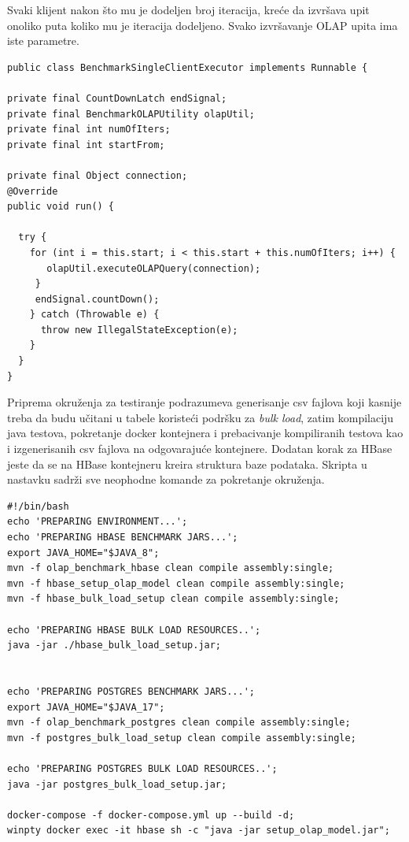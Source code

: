 \documentclass[12pt,oneside]{memoir}
\begin{document}
Svaki klijent nakon što mu je dodeljen broj iteracija, kreće da izvršava upit onoliko puta koliko mu je iteracija dodeljeno. Svako izvršavanje OLAP upita ima iste parametre.


\begin{lstlisting}[title={BenchmarkSingleClientExecutor.java},captionpos=t]
public class BenchmarkSingleClientExecutor implements Runnable {

private final CountDownLatch endSignal;
private final BenchmarkOLAPUtility olapUtil;
private final int numOfIters;
private final int startFrom;

private final Object connection;
@Override
public void run() {

  try {
    for (int i = this.start; i < this.start + this.numOfIters; i++) {
       olapUtil.executeOLAPQuery(connection);
     }
     endSignal.countDown();
    } catch (Throwable e) {
      throw new IllegalStateException(e);
    }
  }
}
\end{lstlisting}

Priprema okruženja za testiranje podrazumeva generisanje csv fajlova koji kasnije treba da budu učitani u tabele koristeći podršku za \textit{bulk load}, zatim kompilaciju java testova, pokretanje docker kontejnera i prebacivanje kompiliranih testova kao i izgenerisanih csv fajlova na odgovarajuće kontejnere. Dodatan korak za HBase jeste da se na HBase kontejneru kreira struktura baze podataka. Skripta u nastavku sadrži sve neophodne komande za pokretanje okruženja.

\begin{lstlisting}[title={prepareEnv.sh},captionpos=t]
#!/bin/bash
echo 'PREPARING ENVIRONMENT...';
echo 'PREPARING HBASE BENCHMARK JARS...';
export JAVA_HOME="$JAVA_8";
mvn -f olap_benchmark_hbase clean compile assembly:single;
mvn -f hbase_setup_olap_model clean compile assembly:single;
mvn -f hbase_bulk_load_setup clean compile assembly:single;

echo 'PREPARING HBASE BULK LOAD RESOURCES..';
java -jar ./hbase_bulk_load_setup.jar;


echo 'PREPARING POSTGRES BENCHMARK JARS...';
export JAVA_HOME="$JAVA_17";
mvn -f olap_benchmark_postgres clean compile assembly:single;
mvn -f postgres_bulk_load_setup clean compile assembly:single;

echo 'PREPARING POSTGRES BULK LOAD RESOURCES..';
java -jar postgres_bulk_load_setup.jar;

docker-compose -f docker-compose.yml up --build -d;
winpty docker exec -it hbase sh -c "java -jar setup_olap_model.jar";
\end{lstlisting}
\end{document}
